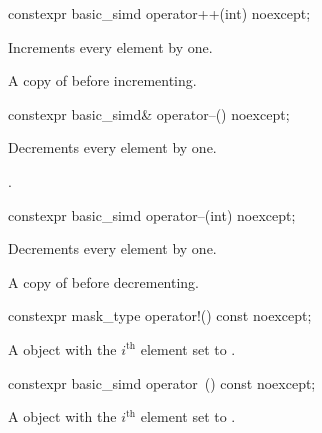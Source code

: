 \begin{itemdecl}
constexpr basic_simd operator++(int) noexcept;
\end{itemdecl}

\begin{itemdescr}
  \pnum{}

  \pnum\effects
  Increments every element by one.

  \pnum\returns
  A copy of  before incrementing.
\end{itemdescr}

\begin{itemdecl}
constexpr basic_simd& operator--() noexcept;
\end{itemdecl}

\begin{itemdescr}
  \pnum{}

  \pnum\effects
  Decrements every element by one.

  \pnum\returns
  .
\end{itemdescr}

\begin{itemdecl}
constexpr basic_simd operator--(int) noexcept;
\end{itemdecl}

\begin{itemdescr}
  \pnum{}

  \pnum\effects
  Decrements every element by one.

  \pnum\returns
  A copy of  before decrementing.
\end{itemdescr}

\begin{itemdecl}
constexpr mask_type operator!() const noexcept;
\end{itemdecl}

\begin{itemdescr}
  \pnum{}

  \pnum\returns
  A  object with the $i^\text{th}$ element set to 
  \foralli.
\end{itemdescr}

\begin{itemdecl}
constexpr basic_simd operator~() const noexcept;
\end{itemdecl}

\begin{itemdescr}
  \pnum{}

  \pnum\returns
  A  object with the $i^\text{th}$ element set to 
  \foralli.
\end{itemdescr}

